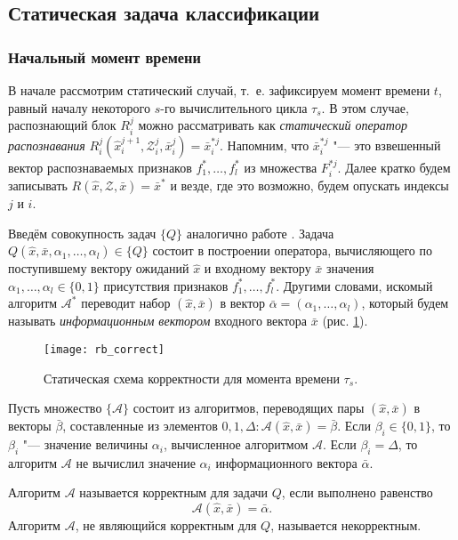 \subsection{Статическая задача классификации}

\subsubsection{Начальный момент времени}
В начале рассмотрим статический случай, т.~е. зафиксируем момент времени $t$, равный началу некоторого $s$-го вычислительного цикла $\tau_s$. В этом случае, распознающий блок $R_i^j$ можно рассматривать как \textit{статический оператор распознавания} $R_i^j(\hat{x}_i^{j+1},\mathcal{Z}_i^j,\bar{x}_i^j)=\bar{x}_i^{*j}$. Напомним, что $\bar{x}_i^{*j}$ "--- это взвешенный вектор распознаваемых признаков $f_1^*,\dots,f_l^*$ из множества $F_i^{*j}$. Далее кратко будем записывать $R(\hat{x},\mathcal{Z},\bar{x})=\bar{x}^*$ и везде, где это возможно, будем опускать индексы $j$ и $i$.
	
Введём совокупность задач $\{Q\}$ аналогично работе \cite{Zhuravlev1977,ZhuravlevE1977}. Задача $Q(\hat{x},\bar{x},\alpha_1,\dots,\alpha_l)\in\{Q\}$ состоит в построении оператора, вычисляющего по поступившему вектору ожиданий $\hat{x}$ и входному вектору $\bar{x}$ значения $\alpha_1,\dots,\alpha_l\in\{0,1\}$ присутствия признаков $f_1^*,\dots,f_l^*$. Другими словами, искомый алгоритм $\mathcal{A}^*$ переводит набор $(\hat{x},\bar{x})$ в вектор $\bar{\alpha}=(\alpha_1,\dots,\alpha_l)$, который будем называть \textit{информационным вектором} входного вектора $\bar{x}$ (рис. \ref{fig:rb_correct_stat0}).
	
\begin{figure}[h]
	\centering
	\texttt{[image: rb\_correct]}
	\caption{Статическая схема корректности для момента времени $\tau_s$.}
	\label{fig:rb_correct_stat0}
\end{figure}

Пусть множество $\{\mathcal{A}\}$ состоит из алгоритмов, переводящих пары $(\hat{x},\bar{x})$ в векторы $\bar{\beta}$, составленные из элементов $0,1,\Delta:\mathcal{A}(\hat{x},\bar{x})=\bar{\beta}$. Если $\beta_i\in\{0,1\}$, то $\beta_i$ "--- значение величины $\alpha_i$, вычисленное алгоритмом $\mathcal{A}$. Если $\beta_i=\Delta$, то алгоритм $\mathcal{A}$ не вычислил значение $\alpha_i$ информационного вектора $\bar\alpha$.
	
\begin{Def}
	Алгоритм $\mathcal{A}$ называется корректным для задачи $Q$, если выполнено равенство
	\[
	\mathcal{A}(\hat{x},\bar{x})=\bar{\alpha}.
	\]
	Алгоритм $\mathcal{A}$, не являющийся корректным для $Q$, называется некорректным.
\end{Def}

